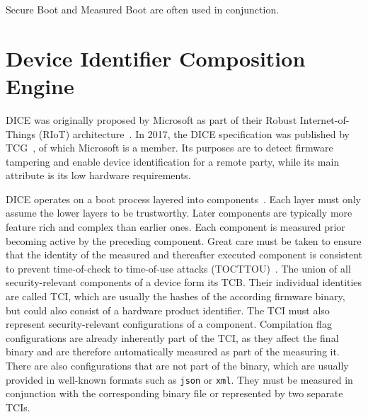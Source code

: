 Secure Boot and Measured Boot are often used in conjunction.

\section{Device Identifier Composition Engine}

\ac{DICE} was originally proposed by Microsoft as part of their Robust Internet-of-Things (RIoT) architecture~\cite{England2016}.
In 2017, the DICE specification was published by \ac{TCG}~\cite{tcg-microsoft-tpm}, of which Microsoft is a member.
Its purposes are to detect firmware tampering and enable device identification for a remote party, while its main attribute is its low hardware requirements.


DICE operates on a boot process layered into components~\cite{dice-layering-arch}.
Each layer must only assume the lower layers to be trustworthy.
Later components are typically more feature rich and complex than earlier ones.
Each component is measured prior becoming active by the preceding component.
Great care must be taken to ensure that the identity of the measured and thereafter executed component is consistent to prevent time-of-check to time-of-use attacks (TOCTTOU)~\cite{Hristozov2022, Carpent2018}.
The union of all security-relevant components of a device form its \ac{TCB}.
Their individual identities are called \ac{TCI}, which are usually the hashes of the according firmware binary, but could also consist of a hardware product identifier.
The TCI must also represent security-relevant configurations of a component.
Compilation flag configurations are already inherently part of the TCI, as they affect the final binary and are therefore automatically measured as part of the measuring it.
There are also configurations that are not part of the binary, which are usually provided in well-known formats such as \texttt{json} or \texttt{xml}.
They must be measured in conjunction with the corresponding binary file or represented by two separate \acp{TCI}.


